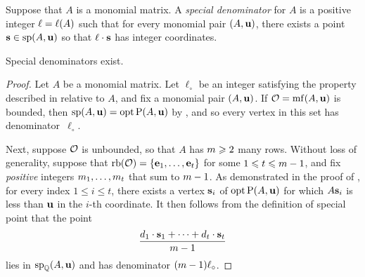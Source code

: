 \documentclass[11pt]{amsart}
\begin{document}

\begin{definition}  Suppose that $A$ is a monomial matrix. A \emph{special denominator} for $A$ is a positive integer $\ell = \ell(A)$ such that for every monomial pair $(A, \mathbf{u})$, there exists a point $\mathbf{s} \in \operatorname{sp}(A, \mathbf{u})$ so that $\ell \cdot \mathbf{s}$ has integer coordinates.
\end{definition}

\begin{theorem}
\label{special-denominators-exist:  T}
Special denominators exist.
\end{theorem}

\begin{proof}
   Let $A$ be a monomial matrix.
   Let $\ell_{\circ}$ be an integer satisfying the property described in  relative to $A$, and fix a monomial pair $(A, \mathbf{u})$.
   If $\mathcal{O} = \operatorname{mf}(A, \mathbf{u})$ is bounded, then $\operatorname{sp}(A, \mathbf{u}) = \operatorname{opt} \mathrm{P}(A, \mathbf{u})$ by , and so every vertex in this set has denominator~$\ell_{\circ}$.

   Next, suppose $\mathcal{O}$ is unbounded, so that $A$ has $m \geqslant 2$ many rows.
   Without loss of generality, suppose that $\operatorname{rb}(\mathcal{O}) = \{ \mathbf{e}_1, \ldots, \mathbf{e}_t \}$ for some $1 \leqslant t \leqslant m-1$, and fix \emph{positive} integers $m_1, \ldots, m_t$ that sum to $m-1$.
   As demonstrated in the  proof of , for every index  $1 \leq i \leq t$, there exists a vertex $\mathbf{s}_i$ of $\operatorname{opt} \mathrm{P}(A, \mathbf{u})$ for which $A \mathbf{s}_i$ is less than $\mathbf{u}$ in the $i$-th coordinate.
   It then follows from the definition of special point that the point
   \[ \frac{ d_1 \cdot \mathbf{s}_1 + \cdots + d_t \cdot  \mathbf{s}_t}{m-1}  \]
   lies in $\operatorname{sp}_{\mathbb{Q}}(A, \mathbf{u})$ and has denominator $(m-1)\ell_{\circ}$.
\end{proof}
\end{document}
